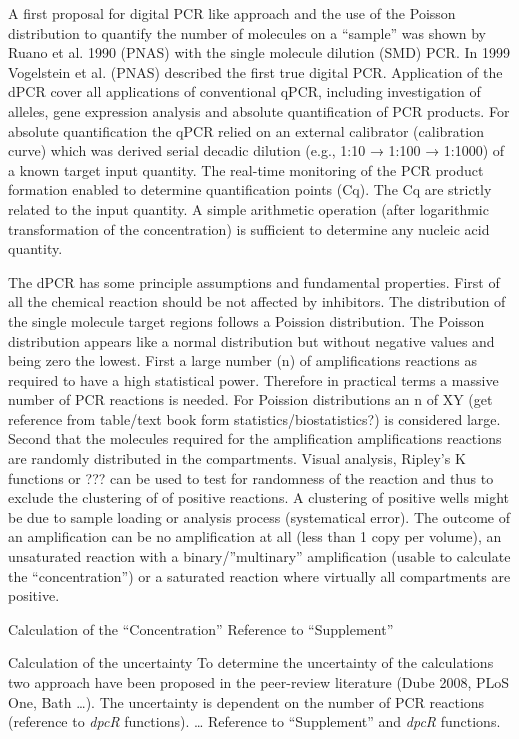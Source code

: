 \documentclass{bioinfo}
\begin{document}
A first proposal for digital PCR like approach and the use of the Poisson distribution to quantify the number of molecules on a “sample” was shown by Ruano et al. 1990 (PNAS) with the single molecule dilution (SMD) PCR. In 1999 Vogelstein et al. (PNAS) described the first true digital PCR. Application of the dPCR cover all applications of conventional qPCR, including investigation of alleles, gene expression analysis and absolute quantification of PCR products. For absolute quantification the qPCR relied on an external calibrator (calibration curve) which was derived serial decadic dilution (e.g., 1:10 → 1:100 → 1:1000) of a known target input quantity. The real-time monitoring of the PCR product formation enabled to determine quantification points (Cq). The Cq are strictly related to the input quantity. A simple arithmetic operation (after logarithmic transformation of the concentration) is sufficient to determine any nucleic acid quantity.

The dPCR has some principle assumptions and fundamental properties. First of all the chemical reaction should be not affected by inhibitors. The distribution of the single molecule target regions follows a Poission distribution. The Poisson distribution appears like a normal distribution but without negative values and being zero the lowest. First a large number (n) of amplifications reactions as required to have a high statistical power. Therefore in practical terms a massive number of PCR reactions is needed. For Poission distributions an n of XY (get reference from table/text book form statistics/biostatistics?) is considered large. Second that the molecules required for the amplification amplifications reactions are randomly distributed in the compartments. Visual analysis, Ripley's K functions or ??? can be used to test for randomness of the reaction and thus to exclude the clustering of of positive reactions. A clustering of positive wells might be due to sample loading or analysis process (systematical error). The outcome of an amplification can be no amplification at all (less than 1 copy per volume), an unsaturated reaction with a binary/”multinary” amplification (usable to calculate the “concentration”) or a saturated reaction where virtually all compartments are positive.

Calculation of the “Concentration”
Reference to “Supplement”

Calculation of the uncertainty
To determine the uncertainty of the calculations two approach have been proposed in the peer-review literature (Dube 2008, PLoS One, Bath …). The uncertainty is dependent on the number of PCR reactions (reference to \textit{\textit{dpcR}} functions). … Reference to “Supplement” and \textit{dpcR} functions.
\end{document}
